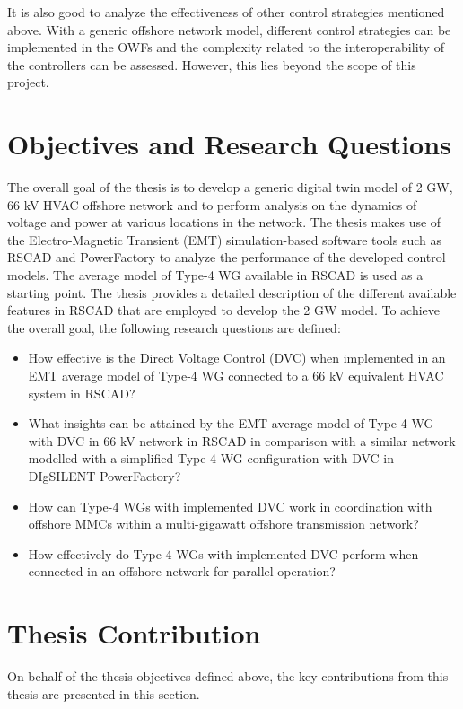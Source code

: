 It is also good to analyze the effectiveness of other control strategies mentioned above. With a generic offshore network model, different control strategies can be implemented in the \gls{OWF}s and the complexity related to the interoperability of the controllers can be assessed. However, this lies beyond the scope of this project.

\section{Objectives and Research Questions}
The overall goal of the thesis is to develop a generic digital twin model of 2 GW, 66 kV \gls{HVAC} offshore network and to perform analysis on the dynamics of voltage and power at various locations in the network. The thesis makes use of the Electro-Magnetic Transient (\gls{EMT}) simulation-based software tools such as RSCAD and PowerFactory to analyze the performance of the developed control models. The average model of Type-4 \gls{WG} available in RSCAD is used as a starting point. The thesis provides a detailed description of the different available features in RSCAD that are employed to develop the 2 GW model. 
To achieve the overall goal, the following research questions are defined:
\begin{itemize}
    \item How effective is the Direct Voltage Control (\gls{DVC}) when implemented in an \gls{EMT} average model of Type-4 \gls{WG} connected to a 66 kV equivalent \gls{HVAC} system in RSCAD?
    
    \item What insights can be attained by the \gls{EMT} average model of Type-4 \gls{WG} with \gls{DVC} in 66 kV network in RSCAD in comparison with a similar network modelled with a simplified Type-4 \gls{WG} configuration with \gls{DVC} in DIgSILENT PowerFactory?
    
    \item How can Type-4 \gls{WG}s with implemented \gls{DVC} work in coordination with offshore \gls{MMC}s within a multi-gigawatt offshore transmission network?
    
    \item How effectively do Type-4 \gls{WG}s with implemented \gls{DVC} perform when connected in an offshore network for parallel operation?

\end{itemize}

\section{Thesis Contribution}
On behalf of the thesis objectives defined above, the key contributions from this thesis are presented in this section.


